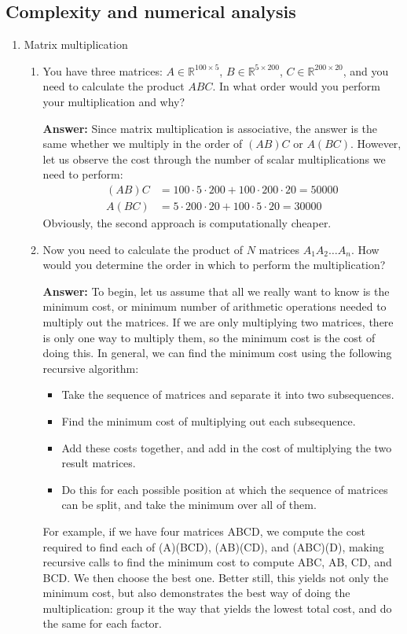 \documentclass{article}
\newenvironment{QandA}{\begin{enumerate}[label=\arabic*.]}{\end{enumerate}}
\newenvironment{InnerQandA}{\begin{enumerate}[label=\roman*.]}{\end{enumerate}}
\newenvironment{answer}{\par\normalfont \textbf{Answer:}}{}
\newcommand{\R}{\mathbb{R}}
\begin{document}
\subsection{Complexity and numerical analysis}
\begin{QandA}
    \item Matrix multiplication
    \begin{InnerQandA}
        \item You have three matrices: $A \in \R^{100 \times 5}$, $B \in \R^{5 \times 200}$, $C \in \R^{200 \times 20}$, and you need to calculate the product $ABC$. In what order would you perform your multiplication and why?
        \begin{answer}
            Since matrix multiplication is associative, the answer is the same whether we multiply in the order of $(AB)C$ or $A(BC)$. However, let us observe the cost through the number of scalar multiplications we need to perform:
            \begin{align*}
                (AB)C &= 100 \cdot 5 \cdot 200 + 100 \cdot 200 \cdot 20 = 50000 \\
                A(BC) &= 5 \cdot 200 \cdot 20 + 100 \cdot 5 \cdot 20 = 30000
            \end{align*}
            Obviously, the second approach is computationally cheaper.
        \end{answer}

        \item Now you need to calculate the product of $N$ matrices  $A_1 A_2 \ldots A_n$. How would you determine the order in which to perform the multiplication?
        \begin{answer}
            To begin, let us assume that all we really want to know is the minimum cost, or minimum number of arithmetic operations needed to multiply out the matrices. If we are only multiplying two matrices, there is only one way to multiply them, so the minimum cost is the cost of doing this. In general, we can find the minimum cost using the following recursive algorithm:
            \begin{itemize}
                \item Take the sequence of matrices and separate it into two subsequences.
                \item Find the minimum cost of multiplying out each subsequence.
                \item Add these costs together, and add in the cost of multiplying the two result matrices.
                \item Do this for each possible position at which the sequence of matrices can be split, and take the minimum over all of them.
            \end{itemize}
            For example, if we have four matrices ABCD, we compute the cost required to find each of (A)(BCD), (AB)(CD), and (ABC)(D), making recursive calls to find the minimum cost to compute ABC, AB, CD, and BCD. We then choose the best one. Better still, this yields not only the minimum cost, but also demonstrates the best way of doing the multiplication: group it the way that yields the lowest total cost, and do the same for each factor.
            

\end{answer}
\end{InnerQandA}
\end{QandA}
\end{document}
